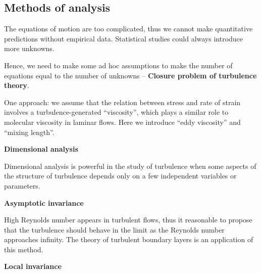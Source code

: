 \subsection{Methods of analysis}

The equations of motion are too complicated, thus we cannot make quantitative predictions without empirical data.
Statistical studies could always introduce more unknowns.

Hence, we need to make some ad hoc assumptions to make the number of equations equal to the number of unknowns -- \textbf{Closure problem of turbulence theory}.

One approach: we assume that the relation between stress and rate of strain involves a turbulence-generated ``viscosity'', which plays a similar role to molecular viscosity in laminar flows.
Here we introduce ``eddy viscosity'' and ``mixing length''.

\textbf{Dimensional analysis}

Dimensional analysis is powerful in the study of turbulence when some aspects of the structure of turbulence depends only on a few independent variables or parameters.

\textbf{Asymptotic invariance}

High Reynolds number appears in turbulent flows, thus it reasonable to propose that the turbulence should behave in the limit as the Reynolds number approaches infinity.
The theory of turbulent boundary layers is an application of this method.

\textbf{Local invariance}

